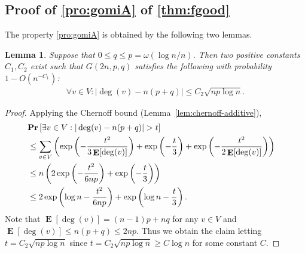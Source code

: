 \documentclass[letterpaper,11pt]{article}
\newtheorem{lemma}[theorem]{Lemma}
\renewcommand\Pr{\mathop{\mathbf{Pr}}}
\DeclareMathOperator{\E}{\mathbf{E}}
\begin{document}
\subsection[Proof of (P3) of Theorem 3.2]{Proof of \ref{pro:gomiA} of \cref{thm:fgood}}\label{sec:gomiA}
The property \ref{pro:gomiA} is obtained by the following two lemmas.
\begin{lemma}\label{lem:maxmindegree}
Suppose that $0\leq q\leq p=\omega(\log n/n)$.
Then two positive constants $C_1, C_2$ exist such that $G(2n,p,q)$ satisfies the following with probability $1-O(n^{-C_1})$:
\begin{align*}
\forall v\in V: |\deg(v)-n(p+q)|\leq C_2\sqrt{np\log n}.
\end{align*}
\end{lemma}
\begin{proof}
Applying the Chernoff bound (Lemma~\ref{lem:chernoff-additive}), 
\begin{align*}
\lefteqn{
\Pr\left[\exists v\in V: |\deg(v)-n(p+q)|> t\right]}\\
&\leq \sum_{v\in V}\left(\exp\left(-\frac{t^2}{3\E[\deg(v)]}\right)+\exp\left(-\frac{t}{3}\right)+\exp\left(-\frac{t^2}{2\E[\deg(v)]}\right)\right)\\
&\leq n\left(2\exp\left(-\frac{t^2}{6np}\right)+ \exp\left(-\frac{t}{3}\right)\right)\\
&\leq 2\exp\left(\log n-\frac{t^2}{6np}\right)+ \exp\left(\log n-\frac{t}{3}\right).
\end{align*}
Note that $\E[\deg(v)]=(n-1)p+nq$ for any $v\in V$ and
$\E[\deg(v)]\leq n(p+q)\leq 2np$.
Thus we obtain the claim letting $t=C_2\sqrt{np\log n}$ since
$
t
=C_2\sqrt{np\log n}
\geq C\log n
$ for some constant $C$.

\end{proof}
%
\end{document}
